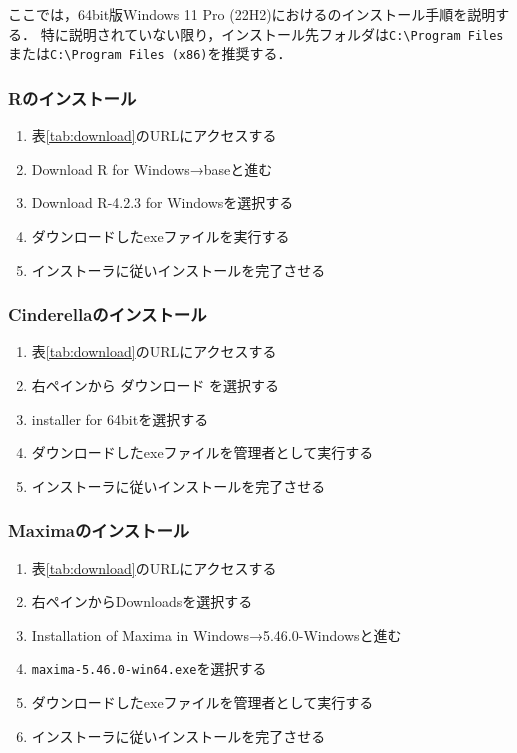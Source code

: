 ここでは，64bit版Windows 11 Pro (22H2)における{\ketcindy}のインストール手順を説明する．
特に説明されていない限り，インストール先フォルダは\verb|C:\Program Files|または\verb|C:\Program Files (x86)|を推奨する．

\subsubsection{Rのインストール}
\begin{enumerate}
    \item 表\ref{tab:download}のURLにアクセスする
    \item Download R for Windows→baseと進む
    \item Download R-4.2.3 for Windowsを選択する
    \item ダウンロードしたexeファイルを実行する
    \item インストーラに従いインストールを完了させる
\end{enumerate}

\subsubsection{Cinderellaのインストール}
\begin{enumerate}
    \item 表\ref{tab:download}のURLにアクセスする
    \item 右ペインから ダウンロード を選択する
    \item installer for 64bitを選択する
    \item ダウンロードしたexeファイルを管理者として実行する
    \item インストーラに従いインストールを完了させる
\end{enumerate}

\newpage

\subsubsection{Maximaのインストール}
\begin{enumerate}
    \item 表\ref{tab:download}のURLにアクセスする
    \item 右ペインからDownloadsを選択する
    \item Installation of Maxima in Windows→5.46.0-Windowsと進む
    \item \verb|maxima-5.46.0-win64.exe|を選択する
    \item ダウンロードしたexeファイルを管理者として実行する
    \item インストーラに従いインストールを完了させる
\end{enumerate}

